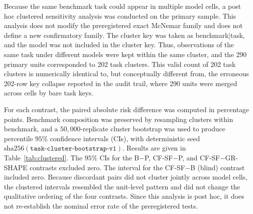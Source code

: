 \documentclass{article}
\numberwithin{equation}{section}  %
\newcommand{\fitwidth}[1]{\resizebox{\ifdim\width>\linewidth \linewidth\else\width\fi}{!}{#1}}
\theoremstyle{definition}
\newcommand{\armP}{\textsf{P}}
\newcommand{\armB}{\textsf{B}}
\newcommand{\armCF}{\textsf{CF-SF}}
\newcommand{\armGR}{\textsf{GR-SHAPE}}
\begin{document}
Because the same benchmark task could appear in multiple model cells, a post hoc clustered
sensitivity analysis was conducted on the primary sample. This analysis does not modify the
preregistered exact McNemar family and does not define a new confirmatory family. The cluster
key was taken as benchmark$|$task, and the model was not included in the cluster key. Thus,
observations of the same task under different models were kept within the same cluster, and
the 290 primary units corresponded to 202 task clusters. This valid count of 202 task clusters
is numerically identical to, but conceptually different from, the erroneous 202-row key
collapse reported in the audit trail, where 290 units were merged across cells by bare task
keys.

For each contrast, the paired absolute risk difference was computed in percentage points.
Benchmark composition was preserved by resampling clusters within benchmark, and a
$50{,}000$-replicate cluster bootstrap was used to produce percentile $95\%$ confidence
intervals (CIs), with deterministic seed
$\mathrm{sha256}(\texttt{task-cluster-bootstrap-v1})$. Results are given in
Table~\ref{tab:clustered}. The $95\%$ CIs for the \armB{}$-$\armP{},
\armCF{}$-$\armP{}, and \armCF{}$-$\armGR{} contrasts excluded zero. The interval for the
\armCF{}$-$\armB{} (blind) contrast included zero. Because discordant pairs did not cluster
jointly across model cells, the clustered intervals resembled the unit-level pattern and did
not change the qualitative ordering of the four contrasts. Since this analysis is post hoc, it
does not re-establish the nominal error rate of the preregistered tests.

\begin{table}[t]
\centering\footnotesize
\caption{Post hoc task-cluster sensitivity analysis (does not modify the preregistered
family). Cluster key: benchmark$|$task. $50{,}000$ cluster-bootstrap replicates were resampled
within benchmark. Deterministic seed:
$\mathrm{sha256}(\texttt{task-cluster-bootstrap-v1})$. Risk difference is reported in
percentage points. Values were computed from committed primary result manifests using
\texttt{analysis/task\_cluster\_effects.py} and independently verified as float-identical
using \texttt{analysis/verify\_clustered\_effects.py}.}
\label{tab:clustered}
\fitwidth{}
\end{table}
\end{document}

